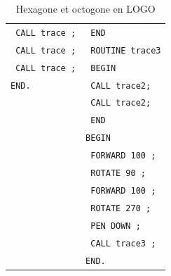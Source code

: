 \begin{table}[t]
\begin{tabular}{l|l}
  \texttt{  CALL trace ;}       &  \texttt{  END}                \\
  \texttt{  CALL trace ;}       &  \texttt{  ROUTINE trace3}     \\
  \texttt{  CALL trace ;}       &  \texttt{  BEGIN}              \\
  \texttt{END.}                 &  \texttt{   CALL trace2;}      \\
                                &  \texttt{    CALL trace2;}     \\
                                &  \texttt{  END}                \\
                                &  \texttt{BEGIN}                \\
                                &  \texttt{  FORWARD 100 ;}      \\
                                &  \texttt{  ROTATE 90 ;}        \\
                                &  \texttt{  FORWARD 100 ;}      \\
                                &  \texttt{  ROTATE 270 ;}       \\
                                &  \texttt{  PEN DOWN ;}         \\
                                &  \texttt{  CALL trace3 ;}      \\
                                &  \texttt{END.}                 \\
  \end{tabular}
  \caption{Hexagone et octogone en LOGO}
\end{table}



